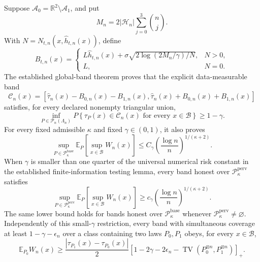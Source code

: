 Suppose \(\mathcal A_0=\mathbb R^2\setminus\mathcal A_1\), and put
\[
M_n=2|\mathcal H_n|\sum_{j=0}^3\binom nj.
\]
With \(N=N_{t,n}(x,\widehat h_{t,n}(x))\), define
\[
B_{t,n}(x)=
\begin{cases}
L\widehat h_{t,n}(x)+\sigma\sqrt{2\log(2M_n/\gamma)/N},&N>0,\\
L,&N=0.
\end{cases}
\]
The established global-band theorem proves that the explicit data-measurable band
\[
\mathcal C_n(x)=
\left[
\widehat\tau_n(x)-B_{0,n}(x)-B_{1,n}(x),
\widehat\tau_n(x)+B_{0,n}(x)+B_{1,n}(x)
\right]
\]
satisfies, for every declared nonempty triangular union,
\[
\inf_{P\in\mathcal P_n(\Lambda_n)}
P\!\left\{
\tau_P(x)\in\mathcal C_n(x)\text{ for every }x\in\mathcal B
\right\}\ge 1-\gamma.
\]
For every fixed admissible \(\kappa\) and fixed \(\gamma\in(0,1)\), it also proves
\[
\sup_{P\in\mathcal P_{\kappa}^{\mathrm{base}}}
\mathbb E_P\!\left[\sup_{x\in\mathcal B}W_n(x)\right]
\le C_\gamma\left(\frac{\log n}{n}\right)^{1/(\kappa+2)}.
\]
When \(\gamma\) is smaller than one quarter of the universal numerical risk constant in the established finite-information testing lemma, every band honest over \(\mathcal P_{\kappa}^{\mathrm{perv}}\) satisfies
\[
\sup_{P\in\mathcal P_{\kappa}^{\mathrm{perv}}}
\mathbb E_P\!\left[\sup_{x\in\mathcal B}W_n(x)\right]
\ge c_\gamma\left(\frac{\log n}{n}\right)^{1/(\kappa+2)}.
\]
The same lower bound holds for bands honest over \(\mathcal P_{\kappa}^{\mathrm{base}}\) whenever \(\mathcal P_{\kappa}^{\mathrm{perv}}\ne\varnothing\). Independently of this small-\(\gamma\) restriction, every band with simultaneous coverage at least \(1-\gamma-\epsilon_n\) over a class containing two laws \(P_0,P_1\) obeys, for every \(x\in\mathcal B\),
\[
\mathbb E_{P_0}W_n(x)\ge
\frac{|\tau_{P_1}(x)-\tau_{P_0}(x)|}{2}
\left[
1-2\gamma-2\epsilon_n-
\operatorname{TV}(P_0^{\otimes n},P_1^{\otimes n})
\right]_+.
\]